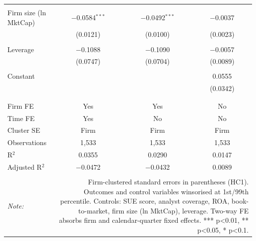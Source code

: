 \begin{table}[!htbp]
\begin{tabular}{@{\extracolsep{5pt}}lccc}
  & & & \\ 
 Firm size (ln MktCap) & $-$0.0584$^{***}$ & $-$0.0492$^{***}$ & $-$0.0037 \\ 
  & (0.0121) & (0.0100) & (0.0023) \\ 
  & & & \\ 
 Leverage & $-$0.1088 & $-$0.1090 & $-$0.0057 \\ 
  & (0.0747) & (0.0704) & (0.0089) \\ 
  & & & \\ 
 Constant &  &  & 0.0555 \\ 
  &  &  & (0.0342) \\ 
  & & & \\ 
\hline \\[-1.8ex] 
Firm FE & Yes & Yes & No \\ 
Time FE & Yes & No & No \\ 
Cluster SE & Firm & Firm & Firm \\ 
Observations & 1,533 & 1,533 & 1,533 \\ 
R$^{2}$ & 0.0355 & 0.0290 & 0.0147 \\ 
Adjusted R$^{2}$ & $-$0.0472 & $-$0.0432 & 0.0089 \\ 
\hline 
\hline \\[-1.8ex] 
\textit{Note:}  & \multicolumn{3}{r}{Firm-clustered standard errors in parentheses (HC1). Outcomes and control variables winsorised at 1st/99th percentile. Controls: SUE score, analyst coverage, ROA, book-to-market, firm size (ln MktCap), leverage. Two-way FE absorbs firm and calendar-quarter fixed effects. *** p<0.01, ** p<0.05, * p<0.1.} \\ 
\end{tabular} 
\end{table} 
